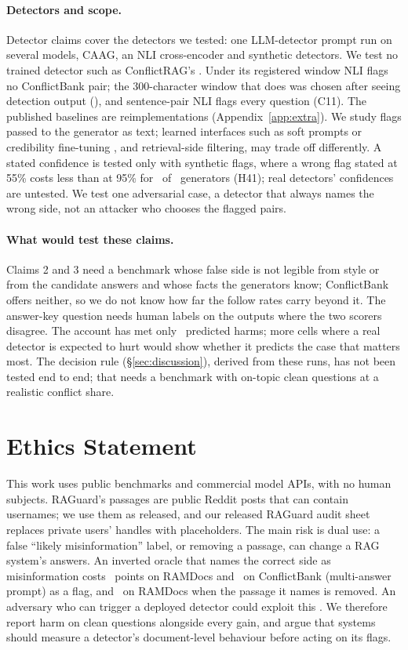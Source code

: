 \paragraph{Detectors and scope.} Detector claims cover the detectors we tested: one LLM-detector prompt run on
several models, CAAG, an NLI cross-encoder and synthetic detectors. We test no trained detector such as ConflictRAG's
\citep{wang2026conflictrag}. Under its registered window NLI flags no ConflictBank pair; the 300-character window that
does was chosen after seeing detection output (), and sentence-pair NLI flags every question (C11). The published baselines are reimplementations (Appendix~\ref{app:extra}). We study
flags passed to the generator as text; learned interfaces such as soft prompts or credibility fine-tuning
\citep{ye2026tcr,pan2024credibility}, and retrieval-side filtering, may trade off differently. A stated confidence is tested only with synthetic flags, where a wrong flag stated at 55\% costs less than at 95\% for
\cxCfWSigN\ of \cxCfN\ generators (H41); real detectors' confidences are untested. We test one
adversarial case, a detector that always names the wrong side, not an attacker who chooses the flagged pairs.

\paragraph{What would test these claims.} Claims 2 and 3 need a benchmark whose false side is not legible from
style or from the candidate answers and whose facts the generators know; ConflictBank offers neither, so we do not know how far the follow rates
carry beyond it. The answer-key question needs human labels on the outputs where the two scorers disagree. The
account has met only \acctHarmN\ predicted harms; more cells where a real detector is expected to hurt would show
whether it predicts the case that matters most. The decision rule (\S\ref{sec:discussion}), derived from these runs, has not
been tested end to end; that needs a benchmark with on-topic clean questions at a realistic conflict share.

\section*{Ethics Statement}
This work uses public benchmarks and commercial model APIs, with no human subjects. RAGuard's passages are
public Reddit posts that can contain usernames; we use them as released, and our released RAGuard audit sheet replaces private users' handles with placeholders. The main
risk is dual use: a false ``likely misinformation'' label, or removing a passage, can
change a RAG system's answers. An inverted oracle that names the correct side as misinformation costs \aadvDirConf\
points on RAMDocs and \azCbMiniOracleInvFlagDirectionalConflict\ on ConflictBank (multi-answer prompt) as a flag, and \aadvRemConf\ on
RAMDocs when the passage it names is removed. An adversary who can trigger a deployed detector could exploit this
\citep{zou2025poisonedrag}. We therefore report harm on clean questions alongside every gain, and argue that
systems should measure a detector's document-level behaviour before acting on its flags.
